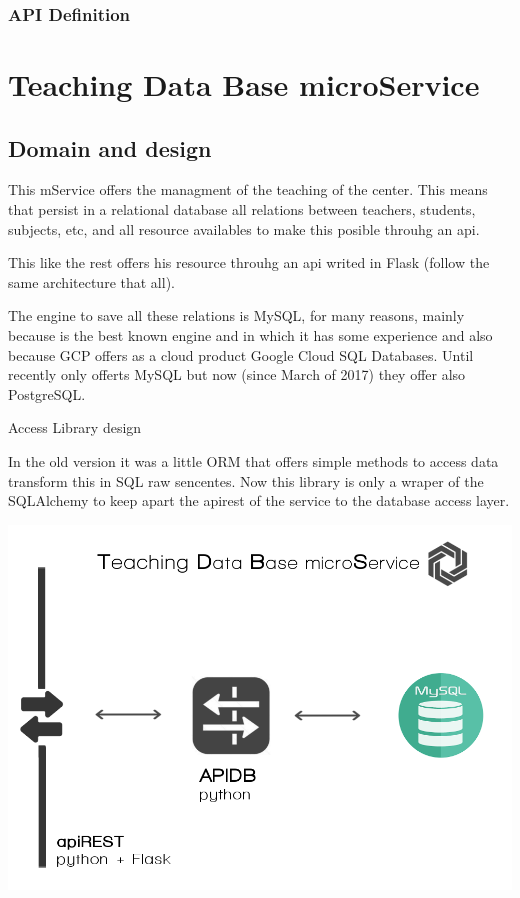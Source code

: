 \subsubsection {API Definition}






\section{Teaching Data Base microService}

\subsection{Domain and design}

This mService offers the managment of the teaching of the center.
This means that persist in a relational database all relations between
teachers, students, subjects, etc, and all resource availables to
make this posible throuhg an api.\bigskip

This like the rest offers his resource throuhg an api writed in Flask
(follow the same architecture that all).

The engine to save all these relations is MySQL, for many reasons,
mainly because is the best known engine and in which it has some experience
and also because GCP offers as a cloud product Google Cloud SQL Databases.
Until recently only offerts MySQL but now (since March of 2017) they
offer also PostgreSQL.

Access Library design

In the old version it was a little ORM that offers simple methods
to access data transform this in SQL raw sencentes. Now this library
is only a wraper of the SQLAlchemy to keep apart the apirest of the
service to the database access layer.

\begin{center}
\includegraphics[scale=0.35]{img/graphics/tdbms.png}
\end{center}

